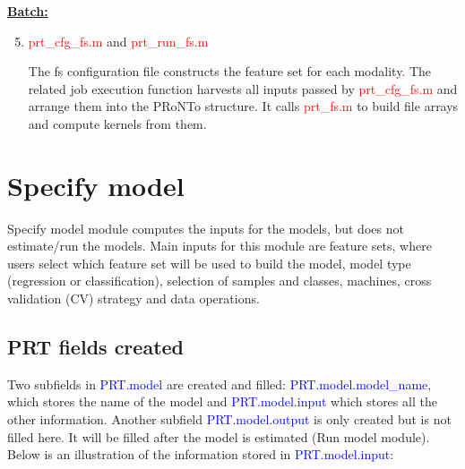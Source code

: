 \noindent \textbf{\underline{Batch:}}

\begin{enumerate}
\setcounter{enumi}{4}

\item \textcolor{red}{prt\_cfg\_fs.m} and \textcolor{red}{prt\_run\_fs.m}

The fs configuration file constructs the feature set for each modality. The related job execution function harvests all inputs passed by \textcolor{red}{prt\_cfg\_fs.m} and arrange them into the PRoNTo structure. It calls \textcolor{red}{prt\_fs.m} to build file arrays and compute kernels from them.


\end{enumerate}








\section{Specify model}

Specify model module computes the inputs for the models, but does not estimate/run the models. Main inputs for this module are feature sets, where users select which feature set will be used to build the model, model type (regression or classification), selection of samples and classes, machines, cross validation (CV) strategy and data operations.

\subsection{PRT fields created}

Two subfields in \textcolor{blue}{PRT.model} are created and filled: \textcolor{blue}{PRT.model.model\_name}, which stores the name of the model and \textcolor{blue}{PRT.model.input} which stores all the other information. Another subfield \textcolor{blue}{PRT.model.output} is only created but is not filled here. It will be filled after the model is estimated (Run model module). Below is an illustration of the information stored in \textcolor{blue}{PRT.model.input}:
 
